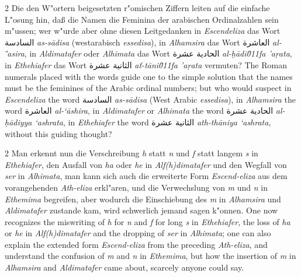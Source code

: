 \documentclass[10pt,a4paper]{article}
\renewcommand{\switchcolumn}{\syncronize\nointerlineskip\columnbreak}
\newcommand{\RL}[1]{\beginR#1\endR}
\newcommand{\ar}[1]{{\arabicfont\RL{#1}}}
\newcommand{\s}[1]{\d{#1}}
\begin{document}
\begin{paracol}{2}
Die den W"ortern beigesetzten r"omischen Ziffern leiten auf die einfache L"osung hin, da\ss{} die Namen die Feminina der arabischen Ordinalzahlen sein m"ussen; wer w"urde aber ohne diesen Leitgedanken in \textit{Escendeliza} das Wort \ar{السادسة} \textit{as-s\=adisa} (westarabisch \textit{essedisa}), in \textit{Alhamsira} das Wort \ar{العاشرة} \textit{al-\='asira}, in \textit{Aldimatafer} oder \textit{Alhimata} das Wort \ar{الحادية عشرة} \textit{al-\d{h}\=adi\u011fa 'a\s{r}ata}, in \textit{Ethehiafer} das Wort \ar{الثانية عشرة} \textit{a\v{t}-t\=ani\u011fa 'a\s{r}ata} vermuten?
\switchcolumn
The Roman numerals placed with the words guide one to the simple solution that the names must be the feminines of the Arabic ordinal numbers; but who would suspect in \textit{Escendeliza} the word \ar{السادسة} \textit{as-s\=adisa} (West Arabic \textit{essedisa}), in \textit{Alhamsira} the word \ar{العاشرة} \textit{al-`\=ashira}, in \textit{Aldimatafer} or \textit{Alhimata} the word \ar{الحادية عشرة} \textit{al-\d{h}\=adiyya `ashrata}, in \textit{Ethehiafer} the word \ar{الثانية عشرة} \textit{ath-th\=aniya `ashrata}, without this guiding thought?
\end{paracol}

\begin{paracol}{2}
Man erkennt nun die Verschreibung \textit{h} statt \textit{n} und \textit{f} statt langem \textit{s} in \textit{Ethehiafer}, den Ausfall von \textit{ha} oder \textit{he} in \textit{Alf(h)dimatafer} und den Wegfall von \textit{ser} in \textit{Alhimata}, man kann sich auch die erweiterte Form \textit{Escend-eliza} aus dem vorangehenden \textit{Ath-eliza} erkl"aren, und die Verwechslung von \textit{m} und \textit{n} in \textit{Ethemima} begreifen, aber wodurch die Einschiebung des \textit{m} in \textit{Alhamsira} und \textit{Aldimatafer} zustande kam, wird schwerlich jemand sagen k"onnen.
\switchcolumn
One now recognizes the miswriting of \textit{h} for \textit{n} and \textit{f} for long \textit{s} in \textit{Ethehiafer}, the loss of \textit{ha} or \textit{he} in \textit{Alf(h)dimatafer} and the dropping of \textit{ser} in \textit{Alhimata}; one can also explain the extended form \textit{Escend-eliza} from the preceding \textit{Ath-eliza}, and understand the confusion of \textit{m} and \textit{n} in \textit{Ethemima}, but how the insertion of \textit{m} in \textit{Alhamsira} and \textit{Aldimatafer} came about, scarcely anyone could say.
\end{paracol}
\end{document}
